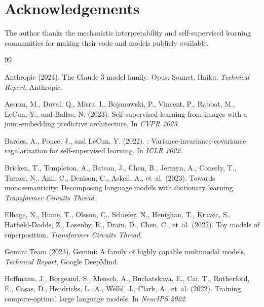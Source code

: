 \documentclass[10pt,twocolumn]{article}
\begin{document}
\section*{Acknowledgements}

The author thanks the mechanistic interpretability and self-supervised
learning communities for making their code and models publicly available.


\begin{thebibliography}{99}

Anthropic (2024).
\newblock The Claude 3 model family: Opus, Sonnet, Haiku.
\newblock \emph{Technical Report}, Anthropic.

Assran, M., Duval, Q., Misra, I., Bojanowski, P., Vincent, P., Rabbat, M.,
  LeCun, Y., and Ballas, N. (2023).
\newblock Self-supervised learning from images with a joint-embedding predictive
  architecture.
\newblock In \emph{CVPR 2023}.

Bardes, A., Ponce, J., and LeCun, Y. (2022).
: Variance-invariance-covariance regularization for
  self-supervised learning.
\newblock In \emph{ICLR 2022}.

Bricken, T., Templeton, A., Batson, J., Chen, B., Jermyn, A., Conerly, T.,
  Turner, N., Anil, C., Denison, C., Askell, A., et~al. (2023).
\newblock Towards monosemanticity: Decomposing language models with dictionary
  learning.
\newblock \emph{Transformer Circuits Thread}.

Elhage, N., Hume, T., Olsson, C., Schiefer, N., Henighan, T., Kravec, S.,
  Hatfield-Dodds, Z., Lasenby, R., Drain, D., Chen, C., et~al. (2022).
\newblock Toy models of superposition.
\newblock \emph{Transformer Circuits Thread}.

Gemini Team (2023).
\newblock Gemini: A family of highly capable multimodal models.
\newblock \emph{Technical Report}, Google DeepMind.

Hoffmann, J., Borgeaud, S., Mensch, A., Buchatskaya, E., Cai, T., Rutherford,
  E., Casas, D., Hendricks, L.~A., Welbl, J., Clark, A., et~al. (2022).
\newblock Training compute-optimal large language models.
\newblock In \emph{NeurIPS 2022}.


\end{thebibliography}
\end{document}
